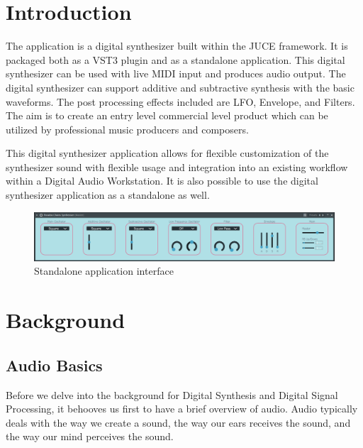 \documentclass[a4paper,12pt]{report}
\begin{document}



\vspace*{\fill}
\begin{center}

\end{center}
\vfill
\thispagestyle{empty}
\newpage
\setcounter{page}{1}

\tableofcontents

\chapter{Introduction}
\label{chapter:intro}

The application is a digital synthesizer built within the JUCE framework. It is packaged both as a VST3 plugin and as a standalone application. This digital synthesizer can be used with live MIDI input and produces audio output. The digital synthesizer can support additive and subtractive synthesis with the basic waveforms. The post processing effects included are LFO, Envelope, and Filters. The aim is to create an entry level commercial level product which can be utilized by professional music producers and composers.

This digital synthesizer application allows for flexible customization of the synthesizer sound with flexible usage and integration into an existing workflow within a Digital Audio Workstation. It is also possible to use the digital synthesizer application as a standalone as well.



\begin{figure}
\centering
\includegraphics[width=36em]{OverallScreenshot.png}
    \caption{Standalone application interface}
    \label{fig:standaloneapplicationinterface}
\end{figure}

\chapter{Background}
\label{chapter:background}
\section{Audio Basics}
\label{sec:audiobasics}
Before we delve into the background for Digital Synthesis and Digital Signal Processing, it behooves us first to have a brief overview of audio. Audio typically deals with the way we create a sound, the way our ears receives the sound, and the way our mind perceives the sound.
\end{document}
